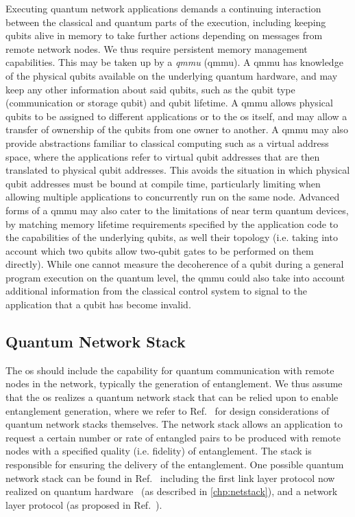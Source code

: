 Executing quantum network applications demands a continuing interaction between the classical and
quantum parts of the execution, including keeping qubits alive in memory to take further actions
depending on messages from remote network nodes. We thus require persistent memory management
capabilities. This may be taken up by a \emph{\acrlong{qmmu}} (\acrshort{qmmu}). A \acrshort{qmmu}
has knowledge of the physical qubits available on the underlying quantum hardware, and may keep any
other information about said qubits, such as the qubit type (communication or storage qubit) and
qubit lifetime. A \acrshort{qmmu} allows physical qubits to be assigned to different applications or
to the \acrshort{os} itself, and may allow a transfer of ownership of the qubits from one owner to
another. A \acrshort{qmmu} may also provide abstractions familiar to classical computing such as a
virtual address space, where the applications refer to virtual qubit addresses that are then
translated to physical qubit addresses. This avoids the situation in which physical qubit addresses
must be bound at compile time, particularly limiting when allowing multiple applications to
concurrently run on the same node. Advanced forms of a \acrshort{qmmu} may also cater to the
limitations of near term quantum devices, by matching memory lifetime requirements specified by the
application code to the capabilities of the underlying qubits, as well their topology (i.e. taking
into account which two qubits allow two-qubit gates to be performed on them directly). While one
cannot measure the decoherence of a qubit during a general program execution on the quantum level,
the \acrshort{qmmu} could also take into account additional information from the classical control
system to signal to the application that a qubit has become invalid.

\subsection{Quantum Network Stack}

The \acrshort{os} should include the capability for quantum communication with remote nodes in the
network, typically the generation of entanglement. We thus assume that the \acrshort{os} realizes a
quantum network stack that can be relied upon to enable entanglement generation, where we refer to
Ref.~\cite{dahlberg_2019_egp} for design considerations of quantum network stacks themselves. The
network stack allows an application to request a certain number or rate of entangled pairs to be
produced with remote nodes with a specified quality (i.e. fidelity) of entanglement. The stack is
responsible for ensuring the delivery of the entanglement. One possible quantum network stack can be
found in Ref.~\cite{dahlberg_2019_egp} including the first link layer protocol now realized on
quantum hardware~\cite{pompili_2022_experimental} (as described in \cref{chp:netstack}), and a
network layer protocol (as proposed in Ref.~\cite{kozlowski_2020_qnp}).

